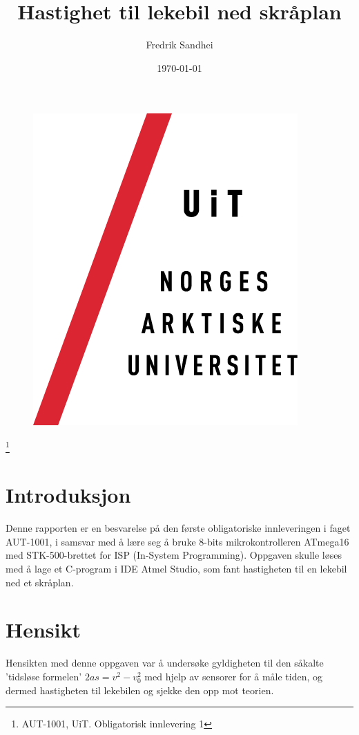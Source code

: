 \documentclass[11pt, a4paper]{report}
\begin{document}
\title{Hastighet til lekebil ned skråplan}
\author{Fredrik Sandhei}
\date{\today}
\maketitle
\begin{figure}[htbp]
	\begin{center}
		\includegraphics[scale = 1.5]{Uitlogo.png}
	\end{center}
\end{figure}
\footnote{AUT-1001, UiT. Obligatorisk innlevering 1}
\newpage
\tableofcontents
\newpage

\section{Introduksjon}
Denne rapporten er en besvarelse på den første obligatoriske innleveringen i faget AUT-1001, i samsvar med å lære seg å bruke 8-bits mikrokontrolleren ATmega16 med STK-500-brettet for ISP (In-System Programming). Oppgaven skulle løses med å lage et C-program i IDE Atmel Studio, som fant hastigheten til en lekebil ned et skråplan. 

\section{Hensikt}
Hensikten med denne oppgaven var å undersøke gyldigheten til den såkalte 'tidsløse formelen' $ 2as = v^{2} - v_{0}^{2} $ med hjelp av sensorer for å måle tiden, og dermed hastigheten til lekebilen og sjekke den opp mot teorien.
\end{document}

